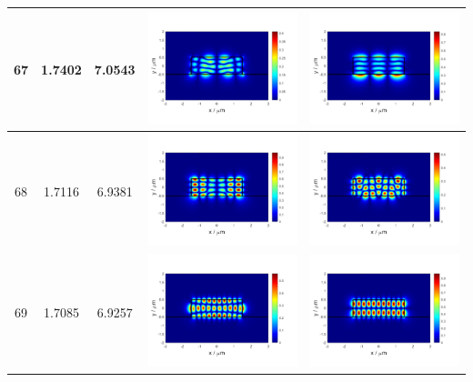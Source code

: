 \documentclass{assignment}
\begin{document}
\begin{sol}
\begin{itemize}
\begin{longtable}[c]{|c|c|c|c|c|}
            67 & 1.7402 & 7.0543 & \includegraphics[width=.3\columnwidth]{Assignment-2-mode-67-Ex.png} & \includegraphics[width=.3\columnwidth]{Assignment-2-mode-67-Ey.png} \\ \hline
            68 & 1.7116 & 6.9381 & \includegraphics[width=.3\columnwidth]{Assignment-2-mode-68-Ex.png} & \includegraphics[width=.3\columnwidth]{Assignment-2-mode-68-Ey.png} \\ \hline
            69 & 1.7085 & 6.9257 & \includegraphics[width=.3\columnwidth]{Assignment-2-mode-69-Ex.png} & \includegraphics[width=.3\columnwidth]{Assignment-2-mode-69-Ey.png} \\ \hline

\end{longtable}
\end{itemize}
\end{sol}
\end{document}
